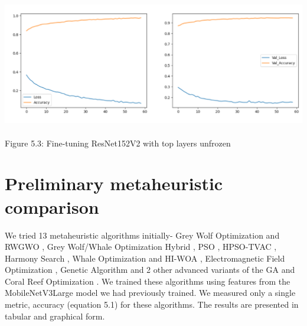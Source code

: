 \begin{center}
   \includegraphics[width=6in, height=2.5in]{images/5.3.png} 
   \\\fontsize{11pt}{24pt}	Figure 5.3: Fine-tuning ResNet152V2 with top layers unfrozen
\end{center}


	

\section{Preliminary metaheuristic comparison}
We tried 13 metaheuristic algorithms initially- Grey Wolf Optimization and RWGWO  \cite{12} \cite{29}, Grey Wolf/Whale Optimization Hybrid  \cite{30}, PSO  \cite{10}, HPSO-TVAC  \cite{24}, Harmony Search  \cite{27}, Whale Optimization and HI-WOA  \cite{31} \cite{32}, Electromagnetic Field Optimization  \cite{33}, Genetic Algorithm and 2 other advanced variants of the GA  \cite{9} and Coral Reef Optimization  \cite{26}. We trained these algorithms using features from the MobileNetV3Large model we had previously trained. We measured only a single metric, accuracy (equation 5.1) for these algorithms. The results are presented in tabular and graphical form.

